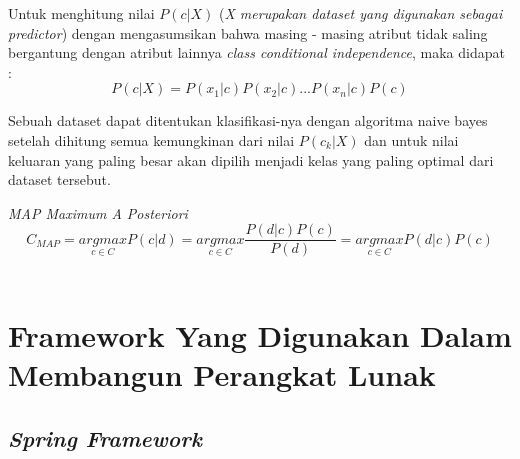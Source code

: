 Untuk menghitung nilai $P(c|X)$ (\textit{X merupakan dataset yang digunakan sebagai predictor}) dengan mengasumsikan bahwa masing - masing atribut tidak saling bergantung dengan atribut lainnya \textit{class conditional independence}, maka didapat : 
\begin{equation}
	P(c|X) = P(x_1|c) P(x_2|c) ... P(x_n|c) P(c)
\end{equation}

Sebuah dataset dapat ditentukan klasifikasi-nya dengan algoritma naive bayes setelah dihitung semua kemungkinan dari nilai $P(c_k|X)$ dan untuk nilai keluaran yang paling besar akan dipilih menjadi kelas yang paling optimal dari dataset tersebut.

\textit{MAP Maximum A Posteriori}
		\begin{equation}
			C_{MAP} = \underset{c \in C}{ argmax } P(c|d) = \underset{c \in C}{ argmax } \dfrac{P(d|c) P(c)}{P(d)} = \underset{c \in C}{ argmax } P(d|c) P(c)
		\end{equation} \\
	
\section{Framework Yang Digunakan Dalam Membangun Perangkat Lunak}

\subsection{\textit{Spring Framework}}
\label{subsec:Spring Framework}

